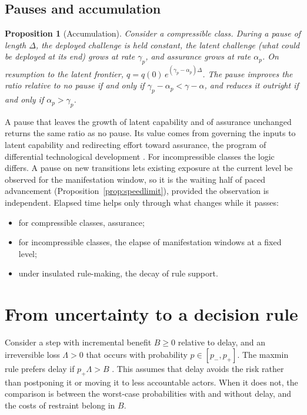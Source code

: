 \documentclass[11pt]{article}
\theoremstyle{plain}
\newtheorem{proposition}{Proposition}
\theoremstyle{definition}
\begin{document}
\subsection{Pauses and accumulation}

\begin{proposition}[Accumulation]\label{prop:accumulation}
Consider a compressible class. During a pause of length $\Delta$, the deployed challenge is held constant, the latent challenge (what could be deployed at its end) grows at rate $\gamma_p$, and assurance grows at rate $\alpha_p$. On resumption to the latent frontier, $q=q(0)\,e^{(\gamma_p-\alpha_p)\Delta}$. The pause improves the ratio relative to no pause if and only if $\gamma_p-\alpha_p<\gamma-\alpha$, and reduces it outright if and only if $\alpha_p>\gamma_p$.
\end{proposition}

A pause that leaves the growth of latent capability and of assurance unchanged returns the same ratio as no pause. Its value comes from governing the inputs to latent capability and redirecting effort toward assurance, the program of differential technological development \citep{bostrom2002}. For incompressible classes the logic differs. A pause on new transitions lets existing exposure at the current level be observed for the manifestation window, so it is the waiting half of paced advancement (Proposition~\ref{prop:speedlimit}), provided the observation is independent. Elapsed time helps only through what changes while it passes:
\begin{itemize}[leftmargin=*]
\item for compressible classes, assurance;
\item for incompressible classes, the elapse of manifestation windows at a fixed level;
\item under insulated rule-making, the decay of rule support.
\end{itemize}

\section{From uncertainty to a decision rule}\label{sec:decision}

Consider a step with incremental benefit $B\ge0$ relative to delay, and an irreversible loss $\Lambda>0$ that occurs with probability $p\in[p_-,p_+]$. The maxmin rule prefers delay if $p_+\Lambda>B$ \citep{gilboa1989}. This assumes that delay avoids the risk rather than postponing it or moving it to less accountable actors. When it does not, the comparison is between the worst-case probabilities with and without delay, and the costs of restraint belong in $B$.
\end{document}
